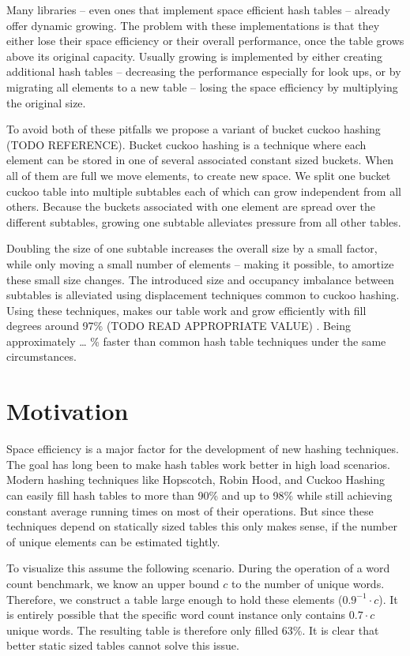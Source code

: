 \documentclass[a4paper,UKenglish]{lipics-v2016}
\begin{document}
Many libraries -- even ones that implement space efficient hash tables
-- already offer dynamic growing.  The problem with these
implementations is that they either lose their space efficiency or
their overall performance, once the table grows above its original
capacity.  Usually growing is implemented by either creating
additional hash tables -- decreasing the performance especially for
look ups, or by migrating all elements to a new table -- losing the
space efficiency by multiplying the original size.

To avoid both of these pitfalls we propose a variant of bucket cuckoo
hashing (TODO REFERENCE).  Bucket cuckoo hashing is a technique where
each element can be stored in one of several associated constant sized
buckets.  When all of them are full we move elements, to create new
space.  We split one bucket cuckoo table into multiple subtables each
of which can grow independent from all others.  Because the buckets
associated with one element are spread over the different subtables,
growing one subtable alleviates pressure from all other tables.

Doubling the size of one subtable increases the overall size by a
small factor, while only moving a small number of elements -- making
it possible, to amortize these small size changes. The introduced size
and occupancy imbalance between subtables is alleviated using
displacement techniques common to cuckoo hashing. Using these
techniques, makes our table work and grow efficiently with fill
degrees around 97\% (TODO READ APPROPRIATE VALUE) .  Being
approximately \ldots{} \% faster than common hash table techniques under the
same circumstances.

\section{Motivation}
Space efficiency is a major factor for the development of new hashing
techniques.  The goal has long been to make hash tables work better in
high load scenarios.  Modern hashing techniques like Hopscotch, Robin
Hood, and Cuckoo Hashing can easily fill hash tables to more than 90\%
and up to 98\% while still achieving constant average running times on
most of their operations.  But since these techniques depend on
statically sized tables this only makes sense, if the number of unique
elements can be estimated tightly.

To visualize this assume the following scenario.  During the operation
of a word count benchmark, we know an upper bound $c$ to the number of
unique words. Therefore, we construct a table large enough to hold
these elements ($0.9^{-1}\cdot c$).  It is entirely possible that the
specific word count instance only contains $0.7\cdot c$ unique words.
The resulting table is therefore only filled 63\%.  It is clear that
better static sized tables cannot solve this issue.
\end{document}

